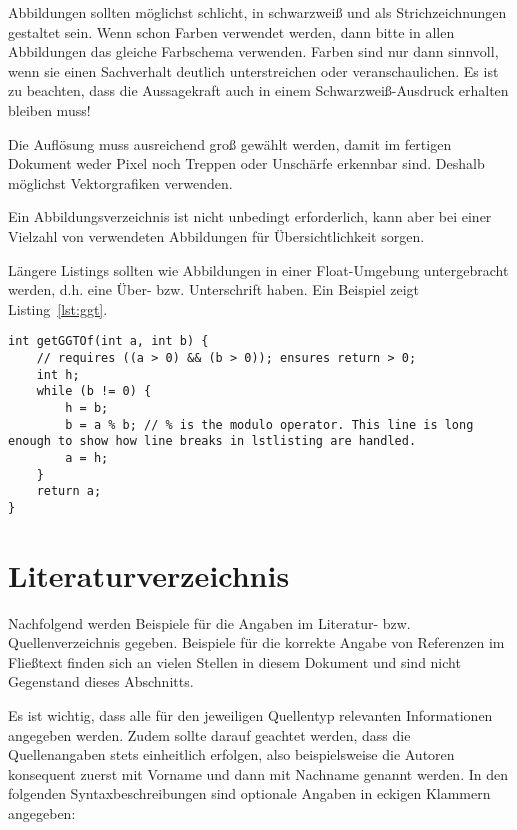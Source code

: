 \documentclass[
    12pt,
    headings=small,
    parskip=half,           %
    bibliography=totoc,
    numbers=noenddot,       %
    open=any,               %
    ]{scrreprt}
\begin{document}
Abbildungen sollten möglichst schlicht, in schwarzweiß und als Strichzeichnungen gestaltet sein. Wenn schon Farben verwendet werden, dann bitte in allen Abbildungen das gleiche Farbschema verwenden. Farben sind nur dann sinnvoll, wenn sie einen Sachverhalt deutlich unterstreichen oder veranschaulichen. Es ist zu beachten, dass die Aussagekraft auch in einem Schwarzweiß-Ausdruck erhalten bleiben muss!

Die Auflösung muss ausreichend groß gewählt werden, damit im fertigen Dokument weder Pixel noch Treppen oder Unschärfe erkennbar sind. Deshalb möglichst Vektorgrafiken verwenden.

Ein Abbildungsverzeichnis ist nicht unbedingt erforderlich, kann aber bei einer Vielzahl von verwendeten Abbildungen für Übersichtlichkeit sorgen.

Längere Listings sollten wie Abbildungen in einer Float-Umgebung untergebracht werden, d.h. eine Über- bzw. Unterschrift haben. Ein Beispiel zeigt Listing~\ref{lst:ggt}.

\begin{lstlisting}[float,caption={Berechnung des größten gemeinsamen Teilers zweier ganzer Zahlen a und b},label={lst:ggt}]
int getGGTOf(int a, int b) {
    // requires ((a > 0) && (b > 0)); ensures return > 0;
    int h;
    while (b != 0) {
        h = b;
        b = a % b; // % is the modulo operator. This line is long enough to show how line breaks in lstlisting are handled.
        a = h;
    }
    return a;
}
\end{lstlisting}

\section{Literaturverzeichnis}

Nachfolgend werden Beispiele für die Angaben im Literatur- bzw. Quellenverzeichnis gegeben. Beispiele für die korrekte Angabe von Referenzen im Fließtext finden sich an vielen Stellen in diesem Dokument und sind nicht Gegenstand dieses Abschnitts.

Es ist wichtig, dass alle für den jeweiligen Quellentyp relevanten Informationen angegeben werden. Zudem sollte darauf geachtet werden, dass die Quellenangaben stets einheitlich erfolgen, also beispielsweise die Autoren konsequent zuerst mit Vorname und dann mit Nachname genannt werden. In den folgenden Syntaxbeschreibungen sind optionale Angaben in eckigen Klammern angegeben:
\end{document}
